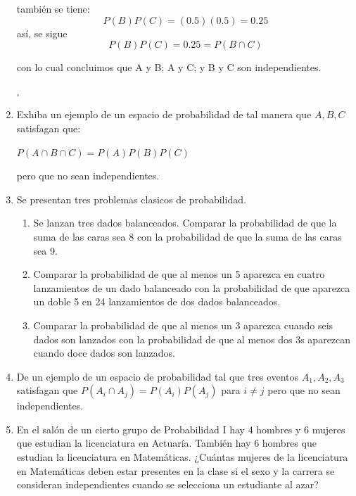 \documentclass[12pt,a4paper]{report}
\begin{document}
\begin{enumerate}
{		también se tiene:
			$$ P(B)P(C) = (0.5)(0.5) = 0.25 $$
		así, se sigue
			$$ P(B)P(C) = 0.25 =  P( B \cap C )$$

		con lo cual concluimos que A y B; A y C; y B y C son independientes.
		\begin{flushright}
			$_{\square}$
		\end{flushright}

	}

   \item {
  Exhiba un ejemplo de un espacio de probabilidad de tal manera que $A,B,C$ satisfagan que: \\
  \begin{center}
  $P(A\cap B \cap C) = P(A)P(B)P(C)$
  \end{center}
  pero que no sean independientes.
	}

   \item {
    Se presentan tres problemas clasicos de probabilidad.

    \begin{enumerate}[label=\alph*) ]
    \item{Se lanzan tres dados balanceados. Comparar la probabilidad de que la suma de las caras sea 8 con la probabilidad de que la suma de las caras sea 9.
    }\\

    \item{Comparar la probabilidad de que al menos un 5 aparezca en cuatro lanzamientos de un dado balanceado con la probabilidad de que aparezca un doble 5 en 24 lanzamientos de dos dados balanceados.} \\
    \item{Comparar la probabilidad de que al menos un 3 aparezca cuando seis dados son lanzados con la probabilidad de que al menos dos 3s aparezcan cuando doce dados son lanzados.}
    \end{enumerate}
	}


   \item {
   De un ejemplo de un espacio de probabilidad tal que tres eventos $A_{1},A_{2},A_{3}$ satisfagan que $P(A_{i}\cap A_{j})=P(A_{i})P(A_{j})$ para $i\neq j$ pero que no sean independientes.\\
	}

   \item {En el salón de un cierto grupo de Probabilidad I hay 4 hombres y 6 mujeres que estudian la licenciatura en Actuaría. También hay 6 hombres que estudian la licenciatura en Matemáticas. ¿Cuántas mujeres de la licenciatura en Matemáticas deben estar presentes en la clase si el sexo y la carrera se consideran independientes cuando se selecciona un estudiante al azar?
	}


\end{enumerate}
\end{document}
